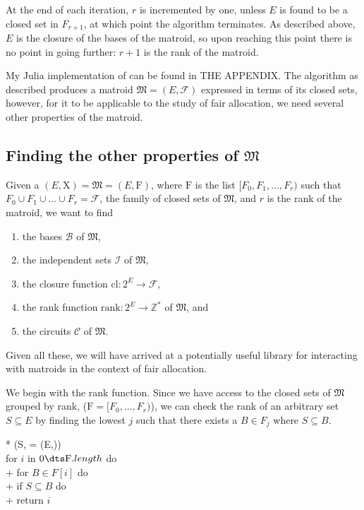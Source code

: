 At the end of each iteration, $r$ is incremented by one, unless $E$ is found to be a closed set in $F_{r+1}$, at which point the algorithm terminates. As described above, $E$ is the closure of the bases of the matroid, so upon reaching this point there is no point in going further: $r+1$ is the rank of the matroid.

My Julia implementation of  can be found in THE APPENDIX. The algorithm as described produces a matroid $\mathfrak{M} = (E, \mathcal{F})$ expressed in terms of its closed sets, however, for it to be applicable to the study of fair allocation, we need several other properties of the matroid.



\subsection*{Finding the other properties of $\mathfrak{M}$}
Given a $(E, \mathrm{X}) = \mathfrak{M} = (E, \mathrm{F})$, where $\mathrm{F}$ is the list $[F_0, F_1, \ldots, F_r)$ such that $F_0 \cup F_1 \cup \ldots \cup F_r = \mathcal{F}$, the family of closed sets of $\mathfrak{M}$, and $r$ is the rank of the matroid, we want to find
\begin{enumerate}
  \item the bases $\mathcal{B}$ of $\mathfrak{M}$,
  \item the independent sets $\mathcal{I}$ of $\mathfrak{M}$,
  \item the closure function $\text{cl} : 2^E \to \mathcal{F}$,
  \item the rank function $\text{rank} : 2^E \to \mathbb{Z}^*$ of $\mathfrak{M}$, and
  \item the circuits $\mathcal{C}$ of $\mathfrak{M}$.
\end{enumerate}

Given all these, we will have arrived at a potentially useful library for interacting with matroids in the context of fair allocation.

We begin with the rank function. Since we have access to the closed sets of $\mathfrak{M}$ grouped by rank, ($\mathrm{F} = [F_0, \ldots, F_r)$), we can check the rank of an arbitrary set $S \subseteq E$ by finding the lowest $j$ such that there exists a $B \in F_j$ where $S \subseteq B$.

\begin{pseudo}*
  ({S,  = (E,)})\\
  for $i$ in $0 \dts \mathrm{F}.length$ do \\+
  for $B \in F[i]$ do \\+
  if $S \subseteq B$ do \\+
  return $i$ 
\end{pseudo}

